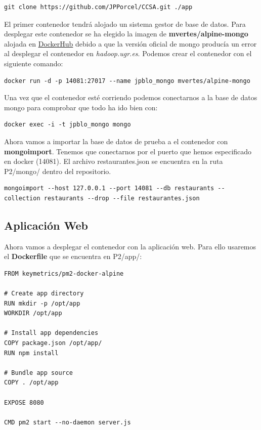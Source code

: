 \begin{lstlisting}
git clone https://github.com/JPPorcel/CCSA.git ./app
\end{lstlisting}

El primer contenedor tendrá alojado un sistema gestor de base de datos. Para desplegar este contenedor se ha elegido la imagen de \textbf{mvertes/alpine-mongo} alojada en \href{https://hub.docker.com/r/mvertes/alpine-mongo/}{DockerHub} debido a que la versión oficial de mongo producía un error al desplegar el contenedor en \textit{hadoop.ugr.es}. Podemos crear el contenedor con el siguiente comando: \\

\begin{lstlisting}
docker run -d -p 14081:27017 --name jpblo_mongo mvertes/alpine-mongo
\end{lstlisting}

Una vez que el contenedor esté corriendo podemos conectarnos a la base de datos mongo para comprobar que todo ha ido bien con: \\

\begin{lstlisting}
docker exec -i -t jpblo_mongo mongo
\end{lstlisting}

Ahora vamos a importar la base de datos de prueba a el contenedor con \textbf{mongoimport}. Tenemos que conectarnos por el puerto que hemos especificado en docker (14081). El archivo restaurantes.json se encuentra en la ruta P2/mongo/ dentro del repositorio. \\

\begin{lstlisting}
mongoimport --host 127.0.0.1 --port 14081 --db restaurants --collection restaurants --drop --file restaurantes.json
\end{lstlisting}

\subsection{Aplicación Web}

Ahora vamos a desplegar el contenedor con la aplicación web. Para ello usaremos el \textbf{Dockerfile} que se encuentra en P2/app/: \\

\begin{lstlisting}
FROM keymetrics/pm2-docker-alpine

# Create app directory
RUN mkdir -p /opt/app
WORKDIR /opt/app

# Install app dependencies
COPY package.json /opt/app/
RUN npm install

# Bundle app source
COPY . /opt/app

EXPOSE 8080

CMD pm2 start --no-daemon server.js
\end{lstlisting}

